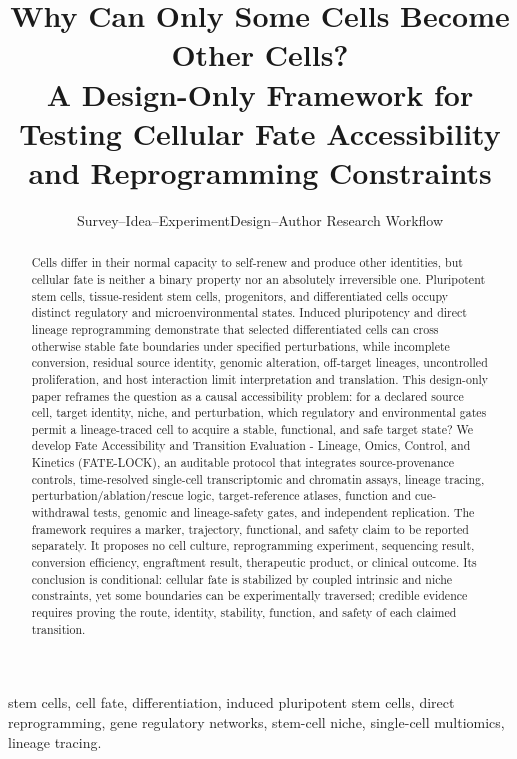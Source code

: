 \documentclass[10pt,conference]{IEEEtran}
\begin{document}
\title{Why Can Only Some Cells Become Other Cells?\\
A Design-Only Framework for Testing Cellular Fate Accessibility and Reprogramming Constraints}

\author{Survey--Idea--ExperimentDesign--Author Research Workflow}

\maketitle

\begin{abstract}
Cells differ in their normal capacity to self-renew and produce other identities, but cellular fate is neither a binary property nor an absolutely irreversible one. Pluripotent stem cells, tissue-resident stem cells, progenitors, and differentiated cells occupy distinct regulatory and microenvironmental states. Induced pluripotency and direct lineage reprogramming demonstrate that selected differentiated cells can cross otherwise stable fate boundaries under specified perturbations, while incomplete conversion, residual source identity, genomic alteration, off-target lineages, uncontrolled proliferation, and host interaction limit interpretation and translation. This design-only paper reframes the question as a causal accessibility problem: for a declared source cell, target identity, niche, and perturbation, which regulatory and environmental gates permit a lineage-traced cell to acquire a stable, functional, and safe target state? We develop Fate Accessibility and Transition Evaluation - Lineage, Omics, Control, and Kinetics (FATE-LOCK), an auditable protocol that integrates source-provenance controls, time-resolved single-cell transcriptomic and chromatin assays, lineage tracing, perturbation/ablation/rescue logic, target-reference atlases, function and cue-withdrawal tests, genomic and lineage-safety gates, and independent replication. The framework requires a marker, trajectory, functional, and safety claim to be reported separately. It proposes no cell culture, reprogramming experiment, sequencing result, conversion efficiency, engraftment result, therapeutic product, or clinical outcome. Its conclusion is conditional: cellular fate is stabilized by coupled intrinsic and niche constraints, yet some boundaries can be experimentally traversed; credible evidence requires proving the route, identity, stability, function, and safety of each claimed transition.
\end{abstract}

\begin{IEEEkeywords}
stem cells, cell fate, differentiation, induced pluripotent stem cells, direct reprogramming, gene regulatory networks, stem-cell niche, single-cell multiomics, lineage tracing.
\end{IEEEkeywords}
\end{document}
